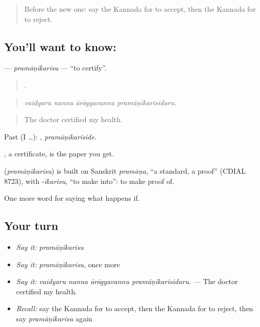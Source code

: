 \label{lesson:KA-C425-pramanikarisu}



\begin{quote}
Before the new one: say the Kannada for to accept, then the Kannada for to reject.
\end{quote}

\subsection*{You'll want to know: }
\textbf{} — \emph{pramāṇīkarisu} — \textquotedblleft{}to certify\textquotedblright{}.

\begin{quote}
   .
\end{quote}

\begin{quote}
\emph{vaidyaru nanna ārōgyavannu pramāṇīkarisidaru.}
\end{quote}

\begin{quote}
The doctor certified my health.
\end{quote}

Past (I …): , \emph{pramāṇīkariside}.

, a certificate, is the paper you get.

\begin{cousinweb}
\textbf{} (\emph{pramāṇīkarisu}) is built on Sanskrit \emph{pramāṇa}, \textquotedblleft{}a standard, a proof\textquotedblright{} (CDIAL 8723), with -\emph{īkarisu}, \textquotedblleft{}to make into\textquotedblright{}: to make proof of.
\end{cousinweb}

\begin{grammarlens}[title={What you've built}]
One more word for saying what happens if.
\end{grammarlens}

\subsection*{Your turn}
\begin{itemize}
\raggedright
  \item \emph{Say it:} \emph{pramāṇīkarisu}
  \item \emph{Say it:} \emph{pramāṇīkarisu}, once more
  \item \emph{Say it:} \emph{vaidyaru nanna ārōgyavannu pramāṇīkarisidaru.} — The doctor certified my health.
  \item \emph{Recall:} say the Kannada for to accept, then the Kannada for to reject, then say \emph{pramāṇīkarisu} again
\end{itemize}

